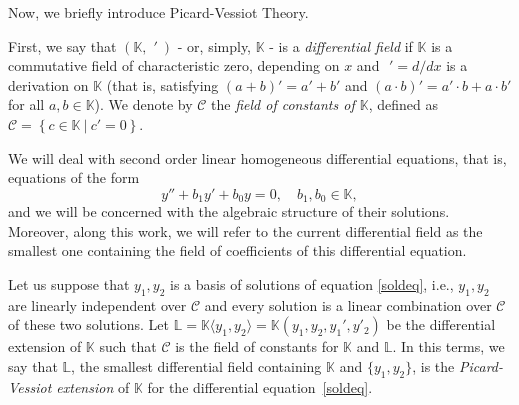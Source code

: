 \documentclass[final]{siamart0516}
\begin{document}
  
Now, we briefly introduce Picard-Vessiot Theory.
    
    First, we say that $\left( \mathbb{K}, \phantom{i}' \ \right)$ - or, simply,
    $\mathbb{K}$ - is a \emph{differential field} if $\mathbb{K}$ is a commutative field
    of characteristic zero, depending on $x$ and $\phantom{i}'= d/dx$ is a
    derivation on $\mathbb{K}$ (that is, satisfying $(a+b)'=a'+b'$
    and $(a\cdot b)'=a'\cdot b+a \cdot b'$ for all $a,b \in \mathbb{K}$). We
    denote by $\mathcal{C}$ the \emph{field of constants of $\mathbb{K}$},
    defined as $\mathcal{C}=\left\{ c \in \mathbb{K} \ | \ c'=0
    \right\}$.
    
    We will deal with second order linear homogeneous differential
    equations, that is, equations of the form
    \begin{equation}
    \label{soldeq}
    y''+b_1y'+b_0y=0,\quad b_1,b_0\in \mathbb{K},
    \end{equation}
    and we will be concerned with the algebraic structure of their solutions. Moreover, along this work, we will refer
    to the current differential field as the smallest one containing the field of coefficients of this differential equation.
    
    Let us suppose that $y_1, y_2$ is a basis of solutions of equation
    \eqref{soldeq}, i.e., $y_1, y_2$ are linearly independent over $\mathcal{C}$
    and every solution is a linear combination over $\mathcal{C}$ of
    these two solutions. Let $\mathbb{L}= \mathbb{K}\langle y_1, y_2 \rangle =\mathbb{K}(y_1, y_2, y_1',
    y'_2)$ be the differential extension of $\mathbb{K}$ such that $\mathcal{C}$
    is the field of constants for $\mathbb{K}$ and $\mathbb{L}$. In this terms, we say
    that $\mathbb{L}$, the smallest differential field containing $\mathbb{K}$ and
    $\{y_{1},y_{2}\}$, is the \textit{Picard-Vessiot extension} of $\mathbb{K}$
    for the differential equation~\eqref{soldeq}.
    
\end{document}
